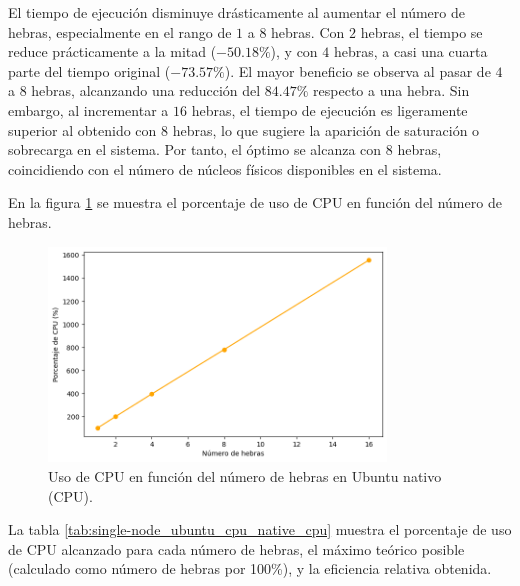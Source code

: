 El tiempo de ejecución disminuye drásticamente al aumentar el número de hebras, especialmente en el rango de $1$ a $8$ hebras. Con $2$ hebras, el tiempo se reduce prácticamente a la mitad ($-50.18\%$), y con $4$ hebras, a casi una cuarta parte del tiempo original ($-73.57\%$). El mayor beneficio se observa al pasar de $4$ a $8$ hebras, alcanzando una reducción del $84.47\%$ respecto a una hebra. Sin embargo, al incrementar a $16$ hebras, el tiempo de ejecución es ligeramente superior al obtenido con $8$ hebras, lo que sugiere la aparición de saturación o sobrecarga en el sistema. Por tanto, el óptimo se alcanza con $8$ hebras, coincidiendo con el número de núcleos físicos disponibles en el sistema.

En la figura \ref{fig:single-node_ubuntu_cpu_native_cpu} se muestra el porcentaje de uso de CPU en función del número de hebras.

\begin{figure}[H]
    \centering
    \includegraphics[width=0.8\textwidth]{imagenes/cap5/single-node_ubuntu_cpu_native_cpu.png}
    \caption{Uso de CPU en función del número de hebras en Ubuntu nativo (CPU).}
    \label{fig:single-node_ubuntu_cpu_native_cpu}
\end{figure}

La tabla \ref{tab:single-node_ubuntu_cpu_native_cpu} muestra el porcentaje de uso de CPU alcanzado para cada número de hebras, el máximo teórico posible (calculado como número de hebras por 100\%), y la eficiencia relativa obtenida.

